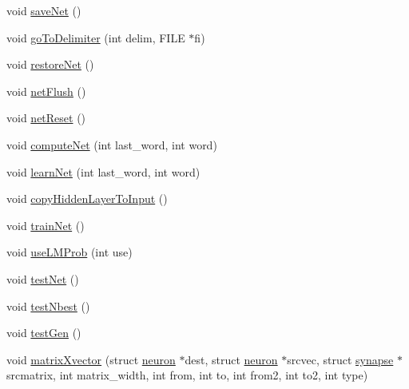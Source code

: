 \begin{DoxyCompactItemize}
void \hyperlink{class_c_rnn_l_m_a64df901ea83fd5f554e3d18afba1f3fb}{save\+Net} ()
\item 
void \hyperlink{class_c_rnn_l_m_ad2a895c2a52eaaa073b6939283ec94e5}{go\+To\+Delimiter} (int delim, F\+I\+LE $\ast$fi)
\item 
void \hyperlink{class_c_rnn_l_m_a929fc03c03c2c216674c10b76c79e61c}{restore\+Net} ()
\item 
void \hyperlink{class_c_rnn_l_m_affa9fdc1830f1269bbfd329584d856fd}{net\+Flush} ()
\item 
void \hyperlink{class_c_rnn_l_m_a6be265565d8a371a04bc5897e597bfec}{net\+Reset} ()
\item 
void \hyperlink{class_c_rnn_l_m_a03796dc7440f3476376f94428e3c000a}{compute\+Net} (int last\+\_\+word, int word)
\item 
void \hyperlink{class_c_rnn_l_m_af8363f58e0c76b9a4e53ffdc5067056a}{learn\+Net} (int last\+\_\+word, int word)
\item 
void \hyperlink{class_c_rnn_l_m_a8fecbd550ae3171d0126bf08c9c2c75a}{copy\+Hidden\+Layer\+To\+Input} ()
\item 
void \hyperlink{class_c_rnn_l_m_ac8e7558dab19f4992c6e82d29f9586a2}{train\+Net} ()
\item 
void \hyperlink{class_c_rnn_l_m_a29b901d49ba5407f42399ba8480abf79}{use\+L\+M\+Prob} (int use)
\item 
void \hyperlink{class_c_rnn_l_m_adb19b3e4ef51c86b7b20157da4e80166}{test\+Net} ()
\item 
void \hyperlink{class_c_rnn_l_m_aa2625f24a2ac406eba4e38a57755097e}{test\+Nbest} ()
\item 
void \hyperlink{class_c_rnn_l_m_a26a06bc47ff999e1d6f96a2e766a2dc5}{test\+Gen} ()
\item 
void \hyperlink{class_c_rnn_l_m_aa9008bc53dc8c4e45c6a884bf2b40882}{matrix\+Xvector} (struct \hyperlink{structneuron}{neuron} $\ast$dest, struct \hyperlink{structneuron}{neuron} $\ast$srcvec, struct \hyperlink{structsynapse}{synapse} $\ast$srcmatrix, int matrix\+\_\+width, int from, int to, int from2, int to2, int type)
\end{DoxyCompactItemize}
